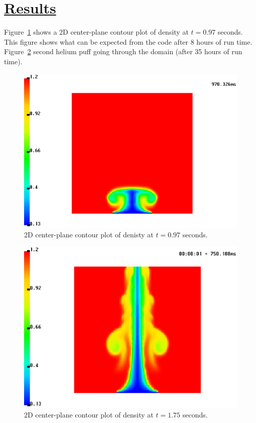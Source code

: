 \documentclass[fleqn]{article}
\begin{document}
\section*{\underline{Results}}
Figure~\ref{results3} shows a 2D center-plane contour plot of density at 
$t=0.97$ seconds. This figure shows what can be expected from the code after
8 hours of run time. Figure~\ref{results4} second helium puff going through
the domain (after 35 hours of run time).
\begin{figure}
\includegraphics[scale=.85]{figures/helium_1m_970.ps}
\caption{2D center-plane contour plot of denisty at $t=0.97$ seconds.}
\label{results3}
\end{figure}
\begin{figure}
\includegraphics[scale=.85]{figures/helium_1m_1750.ps}
\caption{2D center-plane contour plot of density at $t=1.75$ seconds.}
\label{results4}
\end{figure}
\newpage


\end{document}
